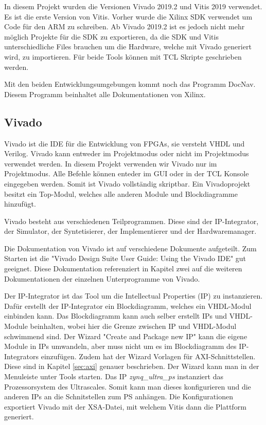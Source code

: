 \documentclass{article}
\begin{document}
In diesem Projekt wurden die Versionen Vivado 2019.2 und Vitis 2019 verwendet. Es ist die erste Version von Vitis. Vorher wurde die Xilinx SDK verwendet um Code für den ARM zu schreiben. Ab Vivado 2019.2 ist es jedoch nicht mehr möglich Projekte für die SDK zu exportieren, da die SDK und Vitis unterschiedliche Files brauchen um die Hardware, welche mit Vivado generiert wird, zu importieren. Für beide Tools können mit TCL Skripte geschrieben werden.

Mit den beiden Entwicklungsumgebungen kommt noch das Programm DocNav. Diesem Programm beinhaltet alle Dokumentationen von Xilinx.
\subsection{Vivado}
Vivado ist die IDE für die Entwicklung von FPGAs, sie versteht VHDL und Verilog. Vivado kann entweder im Projektmodus oder nicht im Projektmodus verwendet werden. In diesem Projekt verwenden wir Vivado nur im Projektmodus. Alle Befehle können enteder im GUI oder in der TCL Konsole eingegeben werden. Somit ist Vivado vollständig skriptbar. Ein Vivadoprojekt besitzt ein Top-Modul, welches alle anderen Module und Blockdiagramme hinzufügt.

Vivado besteht aus verschiedenen Teilprogrammen. Diese sind der IP-Integrator, der Simulator, der Syntetisierer, der Implementierer und der Hardwaremanager.

Die Dokumentation von Vivado ist auf verschiedene Dokumente aufgeteilt. Zum Starten ist die "Vivado Design Suite User Guide: Using the Vivado IDE" gut geeignet. Diese Dokumentation referenziert in Kapitel zwei auf die weiteren Dokumentationen der einzelnen Unterprogramme von Vivado.

Der IP-Integrator ist das Tool um die Intellectual Properties (IP) zu instanzieren. Dafür erstellt der IP-Integrator ein Blockdiagramm, welches ein VHDL-Modul einbinden kann. Das Blockdiagramm kann auch selber erstellt IPs und VHDL-Module beinhalten, wobei hier die Grenze zwischen IP und VHDL-Modul schwimmend sind. Der Wizard "Create and Package new IP" kann die eigene Module in IPs umwandeln, aber muss nicht um es im Blockdiagramm des IP-Integrators einzufügen. Zudem hat der Wizard Vorlagen für AXI-Schnittstellen. Diese sind in Kapitel \ref{sec:axi} genauer beschrieben. Der Wizard kann man in der Menuleiste unter Tools starten. Das IP \textit{zynq\_ultra\_ps} instanziert das Prozessorsystem des Ultrascales. Somit kann man dieses konfigurieren und die anderen IPs an die Schnitstellen zum PS anhängen. Die Konfigurationen exportiert Vivado mit der XSA-Datei, mit welchem Vitis dann die Plattform generiert. 
\end{document}
